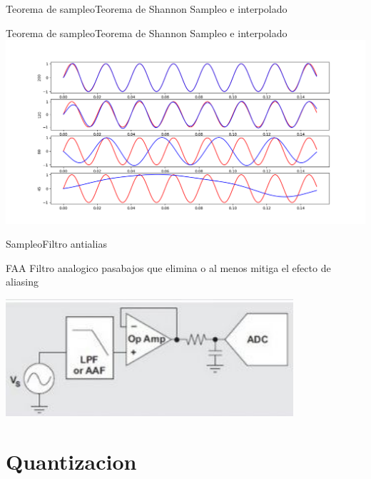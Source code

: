  \begin{frame}{Teorema de sampleo}{Teorema de Shannon}
    \handsonicon
    Sampleo e interpolado
    
    \vfill
 \end{frame}
 \begin{frame}{Teorema de sampleo}{Teorema de Shannon}
    \handsonicon
    Sampleo e interpolado
    \center\includegraphics[width=1.0\textwidth]{1_clase/teorema_sampleo_interpolado}
    \vfill
 \end{frame}
 \begin{frame}{Sampleo}{Filtro antialias}
    \begin{block}{FAA}
       Filtro \alert{analogico} pasabajos que elimina o al menos mitiga el efecto de aliasing
    \end{block}
    \center\includegraphics[width=0.8\textwidth]{1_clase/filtro_anti_aliasing}
    \vfill
 \end{frame}
 \section{Quantizacion}
